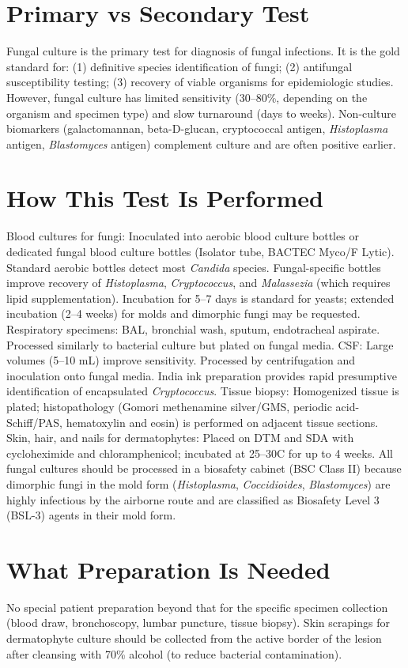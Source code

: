 \section*{Primary vs Secondary Test}
Fungal culture is the primary test for diagnosis of fungal infections. It is the gold standard for: (1) definitive species identification of fungi; (2) antifungal susceptibility testing; (3) recovery of viable organisms for epidemiologic studies. However, fungal culture has limited sensitivity (30--80\%, depending on the organism and specimen type) and slow turnaround (days to weeks). Non-culture biomarkers (galactomannan, beta-D-glucan, cryptococcal antigen, \textit{Histoplasma} antigen, \textit{Blastomyces} antigen) complement culture and are often positive earlier.

\section*{How This Test Is Performed}
Blood cultures for fungi: Inoculated into aerobic blood culture bottles or dedicated fungal blood culture bottles (Isolator tube, BACTEC Myco/F Lytic). Standard aerobic bottles detect most \textit{Candida} species. Fungal-specific bottles improve recovery of \textit{Histoplasma}, \textit{Cryptococcus}, and \textit{Malassezia} (which requires lipid supplementation). Incubation for 5--7 days is standard for yeasts; extended incubation (2--4 weeks) for molds and dimorphic fungi may be requested. Respiratory specimens: BAL, bronchial wash, sputum, endotracheal aspirate. Processed similarly to bacterial culture but plated on fungal media. CSF: Large volumes (5--10 mL) improve sensitivity. Processed by centrifugation and inoculation onto fungal media. India ink preparation provides rapid presumptive identification of encapsulated \textit{Cryptococcus}. Tissue biopsy: Homogenized tissue is plated; histopathology (Gomori methenamine silver/GMS, periodic acid-Schiff/PAS, hematoxylin and eosin) is performed on adjacent tissue sections. Skin, hair, and nails for dermatophytes: Placed on DTM and SDA with cycloheximide and chloramphenicol; incubated at 25--30\textdegree{}C for up to 4 weeks. All fungal cultures should be processed in a biosafety cabinet (BSC Class II) because dimorphic fungi in the mold form (\textit{Histoplasma}, \textit{Coccidioides}, \textit{Blastomyces}) are highly infectious by the airborne route and are classified as Biosafety Level 3 (BSL-3) agents in their mold form.

\section*{What Preparation Is Needed}
No special patient preparation beyond that for the specific specimen collection (blood draw, bronchoscopy, lumbar puncture, tissue biopsy). Skin scrapings for dermatophyte culture should be collected from the active border of the lesion after cleansing with 70\% alcohol (to reduce bacterial contamination).


